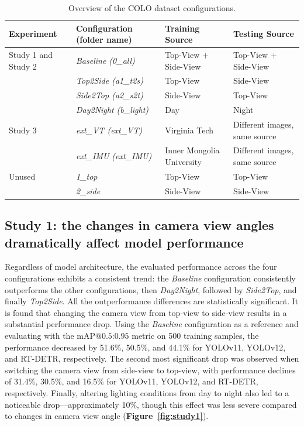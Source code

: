 \begin{table}[h]
    \caption{Overview of the COLO dataset configurations.}
    \centering
    \begin{tabular}{llll}
        \toprule
        \textbf{Experiment} & \textbf{Configuration (folder name)} & \textbf{Training Source} & \textbf{Testing Source} \\
        \midrule
        Study 1 and Study 2& \textit{Baseline (0\_all)} & Top-View + Side-View & Top-View + Side-View \\ [0.5ex]
         & \textit{Top2Side (a1\_t2s)} & Top-View & Side-View \\[0.5ex]
         & \textit{Side2Top (a2\_s2t)} & Side-View & Top-View \\[0.5ex]
         & \textit{Day2Night (b\_light)} & Day & Night \\[0.5ex]
        \midrule
        Study 3 & \textit{ext\_VT (ext\_VT)} & Virginia Tech & Different images, same source \\[0.5ex]
                & \textit{ext\_IMU (ext\_IMU)} & Inner Mongolia University & Different images, same source \\[0.5ex]
        \midrule
        Unused & \textit{1\_top} & Top-View & Top-View \\[0.5ex]
        & \textit{2\_side} & Side-View & Side-View \\[0.5ex]
        \bottomrule
    \end{tabular}
    \label{tab:colo_config}
\end{table}


\subsection*{Study 1: the changes in camera view angles dramatically affect model performance}

Regardless of model architecture, the evaluated performance across the four configurations exhibits a consistent trend: the \textit{Baseline} configuration consistently outperforms the other configurations, then \textit{Day2Night}, followed by \textit{Side2Top}, and finally \textit{Top2Side}. All the outperformance differences are statistically significant. It is found that changing the camera view from top-view to side-view results in a substantial performance drop. Using the \textit{Baseline} configuration as a reference and evaluating with the $\text{mAP@{0.5:0.95}}$ metric on 500 training samples, the performance decreased by 51.6\%, 50.5\%, and 44.1\% for YOLOv11, YOLOv12, and RT-DETR, respectively. The second most significant drop was observed when switching the camera view from side-view to top-view, with performance declines of 31.4\%, 30.5\%, and 16.5\% for YOLOv11, YOLOv12, and RT-DETR, respectively. Finally, altering lighting conditions from day to night also led to a noticeable drop—approximately 10\%, though this effect was less severe compared to changes in camera view angle (\textbf{Figure~\ref{fig:study1}}).

